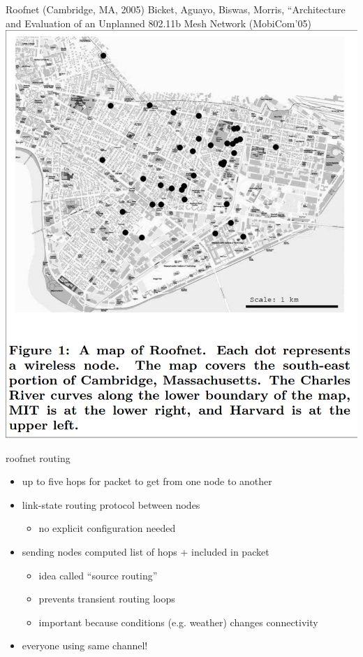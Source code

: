 \begin{frame}{Roofnet (Cambridge, MA, 2005)}
{\fontsize{9}{10}\selectfont Bicket, Aguayo, Biswas, Morris, ``Architecture and Evaluation of
an Unplanned 802.11b Mesh Network (MobiCom'05)}
\includegraphics[height=0.8\textheight]{roofnet-fig1}
\end{frame}

\begin{frame}{roofnet routing}
    \begin{itemize}
    \item up to five hops for packet to get from one node to another
    \item link-state routing protocol between nodes
        \begin{itemize}
        \item no explicit configuration needed
        \end{itemize}
    \item sending nodes computed list of hops + included in packet
        \begin{itemize}
        \item idea called ``source routing''
        \item prevents transient routing loops
        \item important because conditions (e.g. weather) changes connectivity
        \end{itemize}
    \item everyone using same channel!
    \end{itemize}
\end{frame}


